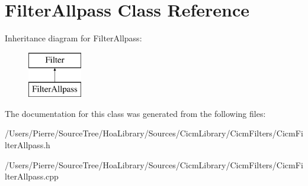 \hypertarget{class_filter_allpass}{\section{Filter\-Allpass Class Reference}
\label{class_filter_allpass}
}
Inheritance diagram for Filter\-Allpass\-:\begin{figure}[H]
\begin{center}
\leavevmode
\includegraphics[height=2.000000cm]{class_filter_allpass}
\end{center}
\end{figure}


The documentation for this class was generated from the following files\-:\begin{DoxyCompactItemize}
\item 
/\-Users/\-Pierre/\-Source\-Tree/\-Hoa\-Library/\-Sources/\-Cicm\-Library/\-Cicm\-Filters/Cicm\-Filter\-Allpass.\-h\item 
/\-Users/\-Pierre/\-Source\-Tree/\-Hoa\-Library/\-Sources/\-Cicm\-Library/\-Cicm\-Filters/Cicm\-Filter\-Allpass.\-cpp\end{DoxyCompactItemize}
